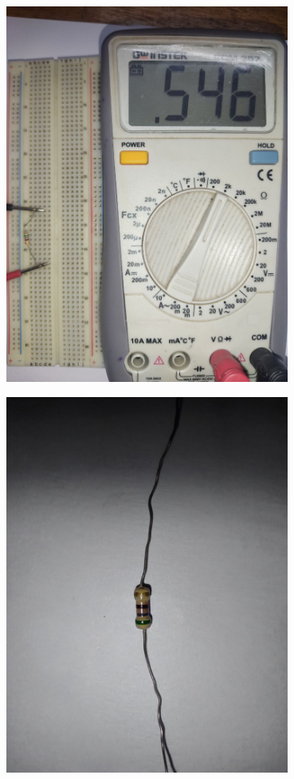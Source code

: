 \documentclass[12pt]{article}
\begin{document}
\begin{minipage}{0.45\textwidth}
    \centering
    \includegraphics[width=0.7\textwidth]{Res3.1.jpg}
\end{minipage}\hspace{30pt}
\begin{minipage}{0.45\textwidth}
    \centering
    \includegraphics[angle=180, width=0.7\textwidth]{Res3.2.jpg}
\end{minipage}
\end{document}
